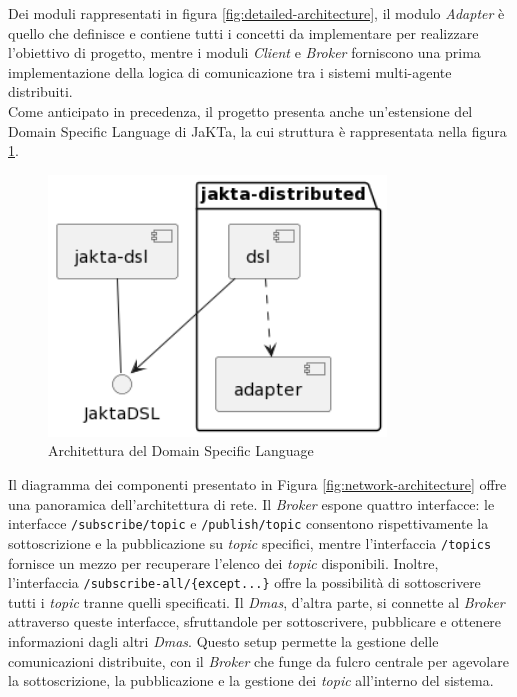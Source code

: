 Dei moduli rappresentati in figura \ref{fig:detailed-architecture}, il modulo \textit{Adapter} è quello che definisce e contiene tutti i concetti da implementare per realizzare l'obiettivo di progetto,
mentre i moduli \textit{Client} e \textit{Broker} forniscono una prima implementazione della logica di comunicazione tra i sistemi multi-agente distribuiti.\\

Come anticipato in precedenza, il progetto presenta anche un'estensione del Domain Specific Language di JaKTa, la cui struttura è rappresentata nella figura \ref{fig:dsl-architecture}.

\begin{figure}[ht!]
    \centering
    \includegraphics[width=0.8\textwidth]{figures/dsl-architecture.png}
    \caption{Architettura del Domain Specific Language}
    \label{fig:dsl-architecture}
\end{figure}

Il diagramma dei componenti presentato in Figura \ref{fig:network-architecture} offre una panoramica dell'architettura di rete.
Il \textit{Broker} espone quattro interfacce: le interfacce \texttt{/subscribe/{topic}} e \texttt{/publish/{topic}} consentono rispettivamente la sottoscrizione e la pubblicazione su \textit{topic} specifici, mentre l'interfaccia \texttt{/topics} fornisce un mezzo per recuperare l'elenco dei \textit{topic} disponibili. Inoltre, l'interfaccia \texttt{/subscribe-all/\{except...\}} offre la possibilità di sottoscrivere tutti i \textit{topic} tranne quelli specificati. Il \textit{Dmas}, d'altra parte, si connette al \textit{Broker} attraverso queste interfacce, sfruttandole per sottoscrivere, pubblicare e ottenere informazioni dagli altri \textit{Dmas}. Questo setup permette la gestione delle comunicazioni distribuite, con il \textit{Broker} che funge da fulcro centrale per agevolare la sottoscrizione, la pubblicazione e la gestione dei \textit{topic} all'interno del sistema.

